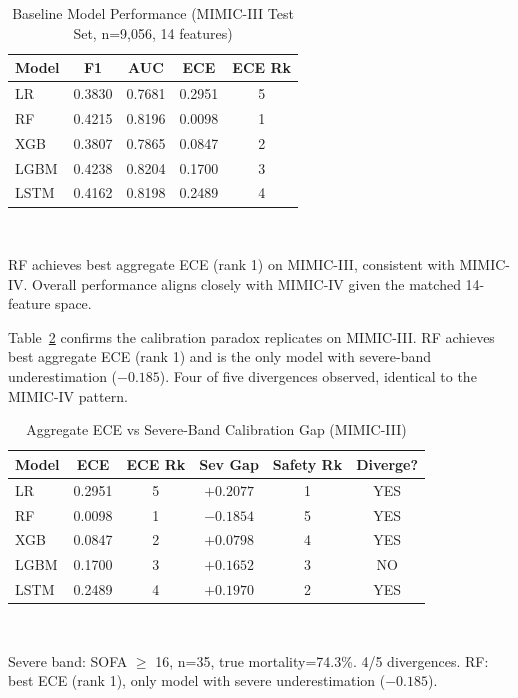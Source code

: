 \documentclass{ieeeaccess}
\begin{document}
\begin{table}[t!]
\caption{Baseline Model Performance (MIMIC-III Test Set, n=9,056, 14 features)}
\label{tab:mimic3_baseline}
\centering
\footnotesize
\setlength{\tabcolsep}{2.5pt}
\begin{tabularx}{\columnwidth}{@{}lcccc@{}}
\toprule
\textbf{Model} & \textbf{F1} & \textbf{AUC} & \textbf{ECE} & \textbf{ECE Rk} \\
\midrule
LR   & 0.3830 & 0.7681 & 0.2951 & 5 \\
RF   & 0.4215 & 0.8196 & 0.0098 & 1 \\
XGB  & 0.3807 & 0.7865 & 0.0847 & 2 \\
LGBM & 0.4238 & 0.8204 & 0.1700 & 3 \\
LSTM & 0.4162 & 0.8198 & 0.2489 & 4 \\
\bottomrule
\end{tabularx}
\\[4pt]
\parbox{\columnwidth}{\footnotesize RF achieves best aggregate ECE (rank 1) on MIMIC-III, consistent with MIMIC-IV. Overall performance aligns closely with MIMIC-IV given the matched 14-feature space.}
\end{table}

Table~\ref{tab:mimic3_core} confirms the calibration paradox replicates on MIMIC-III. RF achieves best aggregate ECE (rank 1) and is the only model with severe-band underestimation ($-0.185$). Four of five divergences observed, identical to the MIMIC-IV pattern.

\begin{table}[t!]
\caption{Aggregate ECE vs Severe-Band Calibration Gap (MIMIC-III)}
\label{tab:mimic3_core}
\centering
\footnotesize
\setlength{\tabcolsep}{2.5pt}
\begin{tabularx}{\columnwidth}{@{}lccccc@{}}
\toprule
\textbf{Model} & \textbf{ECE} & \textbf{ECE Rk} & \textbf{Sev Gap} & \textbf{Safety Rk} & \textbf{Diverge?} \\
\midrule
LR   & 0.2951 & 5 & $+0.2077$ & 1 & YES \\
RF   & 0.0098 & 1 & $-0.1854$ & 5 & YES \\
XGB  & 0.0847 & 2 & $+0.0798$ & 4 & YES \\
LGBM & 0.1700 & 3 & $+0.1652$ & 3 & NO  \\
LSTM & 0.2489 & 4 & $+0.1970$ & 2 & YES \\
\bottomrule
\end{tabularx}
\\[4pt]
\parbox{\columnwidth}{\footnotesize Severe band: SOFA $\ge$ 16, n=35, true mortality=74.3\%. 4/5 divergences. RF: best ECE (rank 1), only model with severe underestimation ($-0.185$).}
\end{table}
\end{document}
